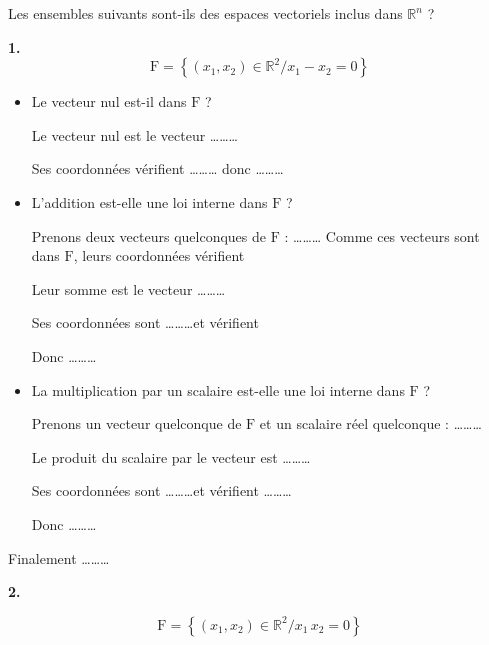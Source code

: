 Les ensembles suivants sont-ils des espaces vectoriels inclus dans $\mathbb{R}^n$ ? 


\textbf{1.}
$$ \mathrm{F}=\left\{\left(x_1, x_2\right) \in \mathbb{R}^2 / x_1-x_2=0\right\}$$

\begin{itemize}[label=$\bullet$, itemsep=1em]
    \item Le vecteur nul est-il dans $\mathrm{F}$ ? 

    Le vecteur nul est le vecteur \dots\dots\dots 

    Ses coordonnées vérifient \dots\dots\dots
    donc \dots\dots\dots 

\item L'addition est-elle une loi interne dans $\mathrm{F}$ ? 

    Prenons deux vecteurs quelconques de $\mathrm{F}$ : \dots\dots\dots \newline
    Comme ces vecteurs sont dans $\mathrm{F}$, leurs coordonnées vérifient \dotfill

    Leur somme est le vecteur \dots\dots\dots 

    Ses coordonnées sont \dots\dots\dots et vérifient \dotfill

    Donc \dots\dots\dots 

\item La multiplication par un scalaire est-elle une loi interne dans $\mathrm{F}$ ? 

    Prenons un vecteur quelconque de $\mathrm{F}$ et un scalaire réel quelconque : \ldots\ldots\ldots 

    Le produit du scalaire par le vecteur est \dots\dots\dots 

    Ses coordonnées sont \dots\dots\dots et vérifient \dots\dots\dots 
    
    Donc \dots\dots\dots 
\end{itemize}

Finalement \dots\dots\dots 

\vspace{1em}

\newpage 

\textbf{2.}

$$    \mathrm{F}=\left\{\left(x_1, x_2\right) \in \mathbb{R}^2 / x_1 \, x_2=0\right\}
    $$

